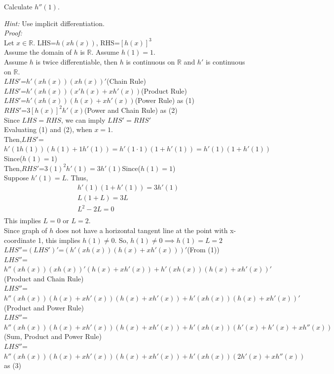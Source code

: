 \documentclass[12pt]{exam}
\newcommand {\DS} [1] {${\displaystyle #1}$}
\newcommand{\vv}{\vspace{.4cm}}
\newcommand{\R}{\mathbb{R}}
\begin{document}
\begin{enumerate}[resume]
	Calculate \DS{h''(1)}.
	
	\emph{Hint:} Use implicit differentiation.
	\vv
	\\
	
	\emph{Proof:}\\
	Let $x\in\R.$
	LHS=$h(xh(x))$, RHS=$[h(x)]^3$\\
	Assume the domain of $h$ is $\R$.
	Assume $h(1)=1.$\\
	Assume $h$ is twice differentiable, then $h$ is continuous on $\R$ and $h'$ is continuous on $\R$.\\
	\DS{LHS'}=$h'(xh(x))(xh(x))'$\qquad(Chain Rule)\\
	\DS{LHS'}=$h'(xh(x))(x'h(x)+xh'(x))$\qquad(Product Rule)\\
	\DS{LHS'}=$h'(xh(x))(h(x)+xh'(x))$\qquad(Power Rule) as (1)\\
	\DS{RHS'}=$3[h(x)]^2h'(x)$\qquad(Power and Chain Rule) as (2)\\
	Since $LHS=RHS$, we can imply $LHS'=RHS'$\\
	Evaluating (1) and (2), when $x=1$. \\
	Then,\DS{LHS'}=$h'(1h(1))(h(1)+1h'(1))=h'(1\cdot1)(1+h'(1))=h'(1)(1+h'(1))$\qquad Since($h(1)=1$)\\
	Then,\DS{RHS'}=$3(1)^2h'(1)=3h'(1)$\qquad Since($h(1)=1$)\\
	Suppose $h'(1)=L.$
	Thus,
	\begin{align*}
	    h'(1)(1+h'(1))=3h'(1)\\
	    L(1+L)=3L\\
	    L^2-2L=0\\
	\end{align*}
	This implies $L=0$ or $L=2.$\\
	Since graph of $h$ does not have a horizontal tangent line at the point with x-coordinate 1, this implies $h(1)\neq0$.
	So, $h(1)\neq0\implies h(1)=L=2$\\
	\DS{LHS''}=\DS{(LHS')'}=$(h'(xh(x))(h(x)+xh'(x)))'$\qquad(From (1))\\
	\DS{LHS''}=$h''(xh(x))(xh(x))'(h(x)+xh'(x))+h'(xh(x))(h(x)+xh'(x))'$\qquad(Product and Chain Rule)\\
	\DS{LHS''}=$h''(xh(x))(h(x)+xh'(x))(h(x)+xh'(x))+h'(xh(x))(h(x)+xh'(x))'$\qquad(Product and Power Rule)\\
	\DS{LHS''}=$h''(xh(x))(h(x)+xh'(x))(h(x)+xh'(x))+h'(xh(x))(h'(x)+h'(x)+xh''(x))$\qquad(Sum, Product and Power Rule)\\
	\DS{LHS''}=$h''(xh(x))(h(x)+xh'(x))(h(x)+xh'(x))+h'(xh(x))(2h'(x)+xh''(x))$\qquad as (3)\\

\end{enumerate}
\end{document}
